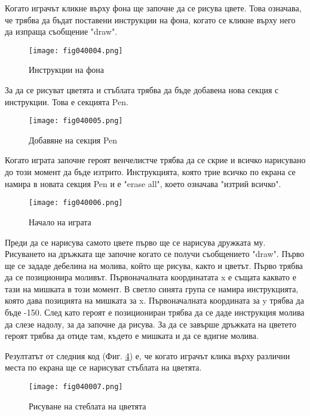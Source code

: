 Когато играчът кликне върху фона ще започне да се рисува цвете. Това означава, че трябва да бъдат поставени инструкции на фона, когато се кликне върху него да изпраща съобщение "draw".

\begin{figure}[H]
  \centering
  \texttt{[image: fig040004.png]}
  \caption{Инструкции на фона}
\label{fig040004}
\end{figure}

За да се рисуват цветята и стъблата трябва да бъде добавена нова секция с инструкции. Това е секцията Pen.

\begin{figure}[H]
  \centering
  \texttt{[image: fig040005.png]}
  \caption{Добавяне на секция Pen}
\label{fig040005}
\end{figure}

Когато играта започне героят венчелистче трябва да се скрие и всичко нарисувано до този момент да бъде изтрито. Инструкцията, която трие всичко по екрана се намира в новата секция Pen и е "erase all", което означава "изтрий всичко".

\begin{figure}[H]
  \centering
  \texttt{[image: fig040006.png]}
  \caption{Начало на играта}
\label{fig040006}
\end{figure}

Преди да се нарисува самото цвете първо ще се нарисува дружката му. Рисуването на дръжката ще започне когато се получи съобщението "draw". Първо ще се зададе дебелина на молива, който ще рисува, както и цветът. Първо трябва да се позиционира моливът. Първоначалната координатата x е същата каквато е тази на мишката в този момент. В светло синята група се намира инструкцията, която дава позицията на мишката за x. Първоначалната координата за y трябва да бъде -150. След като героят е позициониран трябва да се даде инструкция молива да слезе надолу, за да започне да рисува. За да се завърше дръжката на цветето героят трябва да отиде там, където е мишката и да се вдигне молива.

Резултатът от следния код (Фиг. \ref{fig040007}) е, че когато играчът клика върху различни места по екрана ще се нарисуват стъблата на цветята.

\begin{figure}[H]
  \centering
  \texttt{[image: fig040007.png]}
  \caption{Рисуване на стеблата на цветята}
\label{fig040007}
\end{figure}

